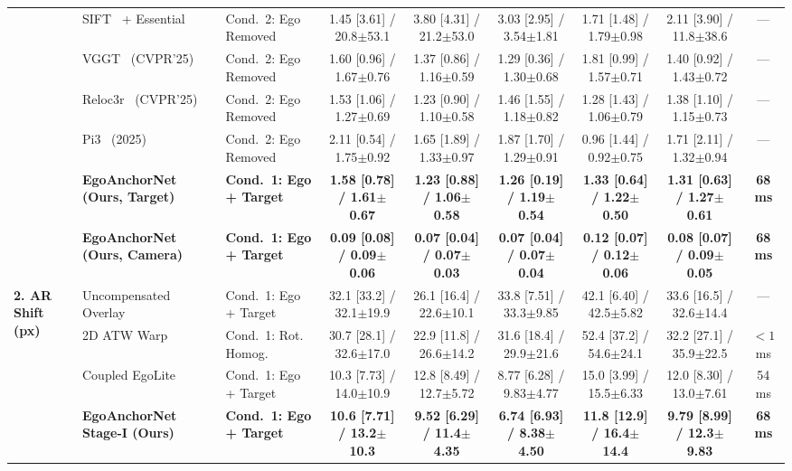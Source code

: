 \documentclass[journal]{IEEEtran}
\begin{document}
\begin{table}[!t]
{\begin{tabular}{lllcccccc}
\cmidrule(lr){2-9}
 & SIFT~\cite{lowe2004distinctive} + Essential & Cond.~2: Ego Removed & 1.45 [3.61] / 20.8$\pm$53.1 & 3.80 [4.31] / 21.2$\pm$53.0 & 3.03 [2.95] / 3.54$\pm$1.81 & 1.71 [1.48] / 1.79$\pm$0.98 & 2.11 [3.90] / 11.8$\pm$38.6 & --- \\
 & VGGT~\cite{wang2025vggt} (CVPR'25) & Cond.~2: Ego Removed & 1.60 [0.96] / 1.67$\pm$0.76 & 1.37 [0.86] / 1.16$\pm$0.59 & 1.29 [0.36] / 1.30$\pm$0.68 & 1.81 [0.99] / 1.57$\pm$0.71 & 1.40 [0.92] / 1.43$\pm$0.72 & --- \\
 & Reloc3r~\cite{dong2025reloc3r} (CVPR'25) & Cond.~2: Ego Removed & 1.53 [1.06] / 1.27$\pm$0.69 & 1.23 [0.90] / 1.10$\pm$0.58 & 1.46 [1.55] / 1.18$\pm$0.82 & 1.28 [1.43] / 1.06$\pm$0.79 & 1.38 [1.10] / 1.15$\pm$0.73 & --- \\
 & Pi3~\cite{wang2025pi3} (2025) & Cond.~2: Ego Removed & 2.11 [0.54] / 1.75$\pm$0.92 & 1.65 [1.89] / 1.33$\pm$0.97 & 1.87 [1.70] / 1.29$\pm$0.91 & 0.96 [1.44] / 0.92$\pm$0.75 & 1.71 [2.11] / 1.32$\pm$0.94 & --- \\
 & \textbf{EgoAnchorNet (Ours, Target)} & \textbf{Cond.~1: Ego + Target} & \textbf{1.58 [0.78] / 1.61$\pm$0.67} & \textbf{1.23 [0.88] / 1.06$\pm$0.58} & \textbf{1.26 [0.19] / 1.19$\pm$0.54} & \textbf{1.33 [0.64] / 1.22$\pm$0.50} & \textbf{1.31 [0.63] / 1.27$\pm$0.61} & \textbf{68 ms} \\
 & \textbf{EgoAnchorNet (Ours, Camera)} & \textbf{Cond.~1: Ego + Target} & \textbf{0.09 [0.08] / 0.09$\pm$0.06} & \textbf{0.07 [0.04] / 0.07$\pm$0.03} & \textbf{0.07 [0.04] / 0.07$\pm$0.04} & \textbf{0.12 [0.07] / 0.12$\pm$0.06} & \textbf{0.08 [0.07] / 0.09$\pm$0.05} & \textbf{68 ms} \\
\midrule
\multirow{5}{*}{\textbf{2. AR Shift (px)}} 
 & Uncompensated Overlay & Cond.~1: Ego + Target & 32.1 [33.2] / 32.1$\pm$19.9 & 26.1 [16.4] / 22.6$\pm$10.1 & 33.8 [7.51] / 33.3$\pm$9.85 & 42.1 [6.40] / 42.5$\pm$5.82 & 33.6 [16.5] / 32.6$\pm$14.4 & --- \\
 & 2D ATW Warp~\cite{lu2025quasar,gao2025xrgo} & Cond.~1: Rot. Homog. & 30.7 [28.1] / 32.6$\pm$17.0 & 22.9 [11.8] / 26.6$\pm$14.2 & 31.6 [18.4] / 29.9$\pm$21.6 & 52.4 [37.2] / 54.6$\pm$24.1 & 32.2 [27.1] / 35.9$\pm$22.5 & $<1$ ms \\
 & Coupled EgoLite & Cond.~1: Ego + Target & 10.3 [7.73] / 14.0$\pm$10.9 & 12.8 [8.49] / 12.7$\pm$5.72 & 8.77 [6.28] / 9.83$\pm$4.77 & 15.0 [3.99] / 15.5$\pm$6.33 & 12.0 [8.30] / 13.0$\pm$7.61 & 54 ms \\
 & \textbf{EgoAnchorNet Stage-I (Ours)} & \textbf{Cond.~1: Ego + Target} & \textbf{10.6 [7.71] / 13.2$\pm$10.3} & \textbf{9.52 [6.29] / 11.4$\pm$4.35} & \textbf{6.74 [6.93] / 8.38$\pm$4.50} & \textbf{11.8 [12.9] / 16.4$\pm$14.4} & \textbf{9.79 [8.99] / 12.3$\pm$9.83} & \textbf{68 ms} \\

\end{tabular}}
\end{table}
\end{document}
